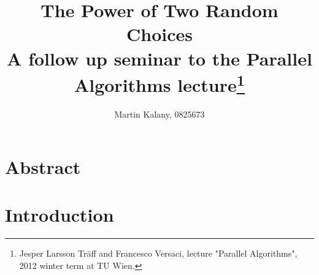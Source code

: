 \documentclass[a4paper,10pt, twocolumn]{article}
\title{The Power of Two Random Choices \\ 
\large A follow up seminar to the Parallel Algorithms lecture\footnote{Jesper Larsson Träff and Francesco Versaci, lecture "Parallel Algorithms", 2012 winter term at TU Wien.}}
\author{Martin Kalany, 0825673}
\begin{document}
\maketitle

\section{Abstract}
\label{sec:abstract}
\cite{mitzen01}

\section{Introduction}
\label{sec:intro}


\printbibliography
\end{document}
